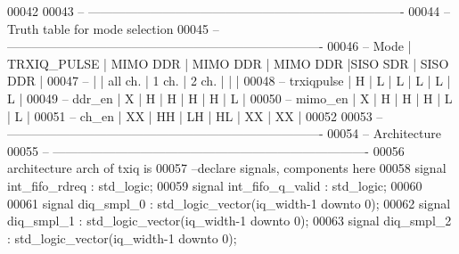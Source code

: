 \begin{DoxyCode}
00042 
00043 \textcolor{keyword}{-- ----------------------------------------------------------------------------}
00044 \textcolor{keyword}{--Truth table for mode selection}
00045 \textcolor{keyword}{-- ----------------------------------------------------------------------------}
00046 \textcolor{keyword}{-- Mode       | TRXIQ\_PULSE  | MIMO DDR  | MIMO DDR  | MIMO DDR  |SISO SDR   | SISO DDR  |}
00047 \textcolor{keyword}{--            |              |  all ch.  |  1 ch.    |  2 ch.    |           |           |}
00048 \textcolor{keyword}{-- trxiqpulse |       H      |     L     |    L      |    L      |     L     |     L     |}
00049 \textcolor{keyword}{-- ddr\_en     |       X      |     H     |    H      |    H      |     H     |     L     |}
00050 \textcolor{keyword}{-- mimo\_en    |       X      |     H     |    H      |    H      |     L     |     L     |}
00051 \textcolor{keyword}{-- ch\_en      |       XX     |     HH    |   LH      |    HL     |     XX    |     XX    |}
00052 
00053 \textcolor{keyword}{-- ----------------------------------------------------------------------------}
00054 \textcolor{keyword}{-- Architecture}
00055 \textcolor{keyword}{-- ----------------------------------------------------------------------------}
00056 \textcolor{keywordflow}{architecture} arch \textcolor{keywordflow}{of} txiq is
00057 \textcolor{keyword}{--declare signals,  components here}
00058 \textcolor{keywordflow}{signal} \textcolor{vhdlchar}{int_fifo_rdreq}      \textcolor{vhdlchar}{:} \textcolor{comment}{std\_logic};
00059 \textcolor{keywordflow}{signal} \textcolor{vhdlchar}{int_fifo_q_valid}    \textcolor{vhdlchar}{:} \textcolor{comment}{std\_logic};
00060 
00061 \textcolor{keywordflow}{signal} \textcolor{vhdlchar}{diq_smpl_0}          \textcolor{vhdlchar}{:} \textcolor{comment}{std\_logic\_vector}\textcolor{vhdlchar}{(}\textcolor{vhdlchar}{iq_width}\textcolor{vhdlchar}{-}\textcolor{vhdllogic}{}\textcolor{vhdllogic}{1} \textcolor{keywordflow}{downto} \textcolor{vhdllogic}{}\textcolor{vhdllogic}{0}\textcolor{vhdlchar}{)};
00062 \textcolor{keywordflow}{signal} \textcolor{vhdlchar}{diq_smpl_1}          \textcolor{vhdlchar}{:} \textcolor{comment}{std\_logic\_vector}\textcolor{vhdlchar}{(}\textcolor{vhdlchar}{iq_width}\textcolor{vhdlchar}{-}\textcolor{vhdllogic}{}\textcolor{vhdllogic}{1} \textcolor{keywordflow}{downto} \textcolor{vhdllogic}{}\textcolor{vhdllogic}{0}\textcolor{vhdlchar}{)};
00063 \textcolor{keywordflow}{signal} \textcolor{vhdlchar}{diq_smpl_2}          \textcolor{vhdlchar}{:} \textcolor{comment}{std\_logic\_vector}\textcolor{vhdlchar}{(}\textcolor{vhdlchar}{iq_width}\textcolor{vhdlchar}{-}\textcolor{vhdllogic}{}\textcolor{vhdllogic}{1} \textcolor{keywordflow}{downto} \textcolor{vhdllogic}{}\textcolor{vhdllogic}{0}\textcolor{vhdlchar}{)};

\end{DoxyCode}
